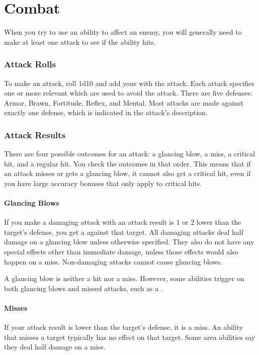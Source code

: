 \chapter{Combat}\label{Combat}

  When you try to use an ability to affect an enemy, you will generally need to make at least one attack to see if the ability hits.

  \subsection{Attack Rolls}\label{Attack Rolls}
    To make an attack, roll 1d10 and add your  with the attack.
    Each attack specifies one or more relevant  which are used to avoid the attack.
    There are five defenses: Armor, Brawn, Fortitude, Reflex, and Mental.
    Most attacks are made against exactly one defense, which is indicated in the attack's description.

  \subsection{Attack Results}
    There are four possible outcomes for an attack: a glancing blow, a miss, a critical hit, and a regular hit.
    You check the outcomes in that order.
    This means that if an attack misses or gets a glancing blow, it cannot also get a critical hit, even if you have large accuracy bonuses that only apply to critical hits.

    \subsubsection{Glancing Blows}\label{Glancing Blows}
      If you make a damaging attack with an attack result is 1 or 2 lower than the target's defense, you get a  against that target.
      All damaging attacks deal half damage on a glancing blow unless otherwise specified.
      They also do not have any special effects other than immediate damage, unless those effects would also happen on a miss.
      Non-damaging attacks cannot cause glancing blows.

      A glancing blow is neither a hit nor a miss.
      However, some abilities trigger on both glancing blows and missed attacks, such as a .

    \subsubsection{Misses}
      If your attack result is lower than the target's defense, it is a miss.
      An ability that misses a target typically has no effect on that target.
      Some area abilities say they deal half damage on a miss.

